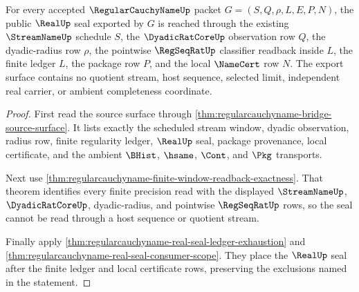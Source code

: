 \begin{theorem}
\label{thm:regularcauchyname-public-real-seal-export}
For every accepted $\RegularCauchyNameUp$ packet $G=(S,Q,\rho,L,E,P,N)$, the public $\RealUp$ seal exported by $G$ is reached through the existing $\StreamNameUp$ schedule $S$, the $\DyadicRatCoreUp$ observation row $Q$, the dyadic-radius row $\rho$, the pointwise $\RegSeqRatUp$ classifier readback inside $L$, the finite ledger $L$, the package row $P$, and the local $\NameCert$ row $N$. The export surface contains no quotient stream, host sequence, selected limit, independent real carrier, or ambient completeness coordinate.
\end{theorem}
\begin{proof}
First read the source surface through \autoref{thm:regularcauchyname-bridge-source-surface}. It lists exactly the scheduled stream window, dyadic observation, radius row, finite regularity ledger, $\RealUp$ seal, package provenance, local certificate, and the ambient $\BHist$, $\hsame$, $\Cont$, and $\Pkg$ transports.

Next use \autoref{thm:regularcauchyname-finite-window-readback-exactness}. That theorem identifies every finite precision read with the displayed $\StreamNameUp$, $\DyadicRatCoreUp$, dyadic-radius, and pointwise $\RegSeqRatUp$ rows, so the seal cannot be read through a host sequence or quotient stream.

Finally apply \autoref{thm:regularcauchyname-real-seal-ledger-exhaustion} and \autoref{thm:regularcauchyname-real-seal-consumer-scope}. They place the $\RealUp$ seal after the finite ledger and local certificate rows, preserving the exclusions named in the statement.
\end{proof}


